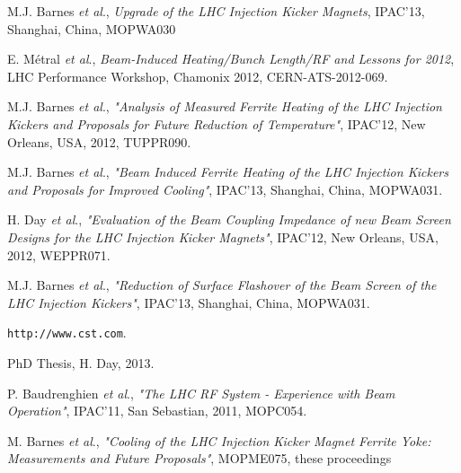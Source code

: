 \documentclass[a4paper,
              ]{jacow}
\begin{document}

%
%
%

% 


\begin{thebibliography}{99}

M.J. Barnes \emph{et al}., \emph{Upgrade of the LHC Injection Kicker Magnets}, IPAC'13, Shanghai, China, MOPWA030

E. Métral \emph{et al}., \emph{Beam-Induced Heating/Bunch Length/RF and Lessons for 2012}, LHC Performance Workshop, Chamonix 2012, CERN-ATS-2012-069. 

M.J. Barnes \emph{et al}., \emph{"Analysis of Measured Ferrite Heating of the LHC Injection Kickers and Proposals for Future Reduction of Temperature"}, IPAC'12, New Orleans, USA, 2012, TUPPR090.

M.J. Barnes \emph{et al}., \emph{"Beam Induced Ferrite Heating of the LHC Injection Kickers and Proposals for Improved Cooling"}, IPAC'13, Shanghai, China, MOPWA031.

H. Day \emph{et al}., \emph{"Evaluation of the Beam Coupling Impedance of new Beam Screen Designs for the LHC Injection Kicker Magnets"}, IPAC'12, New Orleans, USA, 2012, WEPPR071.

M.J. Barnes \emph{et al}., \emph{"Reduction of Surface Flashover of the Beam Screen of the LHC Injection Kickers"}, IPAC'13, Shanghai, China, MOPWA031.

\texttt{http://www.cst.com}.

PhD Thesis, H. Day, 2013.

P. Baudrenghien \emph{et al}., \emph{"The LHC RF System - Experience with Beam Operation"}, IPAC'11, San Sebastian, 2011, MOPC054.

M. Barnes \emph{et al}., \emph{"Cooling of the LHC Injection Kicker Magnet Ferrite Yoke: Measurements and Future Proposals"}, MOPME075, these proceedings

\end{thebibliography}
\end{document}
